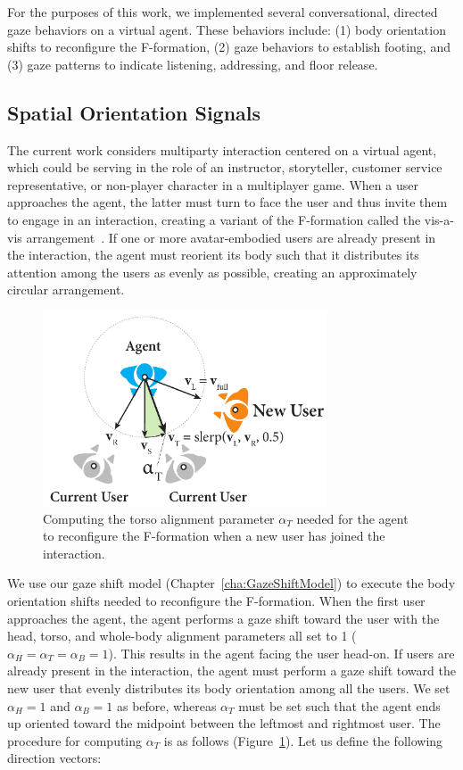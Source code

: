 For the purposes of this work, we implemented several conversational, directed gaze behaviors on a virtual agent. These behaviors include: (1) body orientation shifts to reconfigure the F-formation, (2) gaze behaviors to establish footing, and (3) gaze patterns to indicate listening, addressing, and floor release.

\subsection{Spatial Orientation Signals}

The current work considers multiparty interaction centered on a virtual agent, which could be serving in the role of an instructor, storyteller, customer service representative, or non-player character in a multiplayer game. When a user approaches the agent, the latter must turn to face the user and thus invite them to engage in an interaction, creating a variant of the F-formation called the vis-a-vis arrangement~\cite{kendon1990conducting}. If one or more avatar-embodied users are already present in the interaction, the agent must reorient its body such that it distributes its attention among the users as evenly as possible, creating an approximately circular arrangement.

\begin{figure}
\centering
\includegraphics[width=0.75\textwidth]{conversationalrolegaze/Figures/FTorsoAlign.pdf}
\caption{Computing the torso alignment parameter $\alpha_T$ needed for the agent to reconfigure the F-formation when a new user has joined the interaction.}
\label{fig:FTorsoAlign}
\end{figure}

We use our gaze shift model (Chapter~\ref{cha:GazeShiftModel}) to execute the body orientation shifts needed to reconfigure the F-formation. When the first user approaches the agent, the agent performs a gaze shift toward the user with the head, torso, and whole-body alignment parameters all set to 1 ($\alpha_H = \alpha_T = \alpha_B = 1$). This results in the agent facing the user head-on. If users are already present in the interaction, the agent must perform a gaze shift toward the new user that evenly distributes its body orientation among all the users. We set $\alpha_H = 1$ and $\alpha_B = 1$ as before, whereas $\alpha_T$ must be set such that the agent ends up oriented toward the midpoint between the leftmost and rightmost user. The procedure for computing $\alpha_T$ is as follows (Figure~\ref{fig:FTorsoAlign}). Let us define the following direction vectors:

